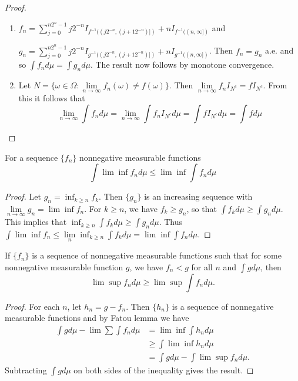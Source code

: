 \begin{proof}
\begin{enumerate}
\item $f_n=\sum_{j=0}^{n2^n-1}j2^{-n}I_{f^{-1}((j2^{-n},(j+12^{-n})])}+nI_{f^{-1}((n,\infty])}$ and 

$g_n=\sum_{j=0}^{n2^n-1}j2^{-n}I_{g^{-1}((j2^{-n},(j+12^{-n})])}+nI_{g^{-1}((n,\infty])}$. Then $f_n=g_n$ a.e. and so $\int f_nd\mu=\int g_nd\mu$. The result now follows by monotone convergence.

\item Let $N=\{\omega\in\Omega: \lim\limits_{n\to\infty}f_n(\omega)\neq f(\omega) \}$. Then $\lim\limits_{n\to\infty}f_nI_{N^c}=fI_{N^c}$. From this it follows that 
\begin{equation*}
\lim\limits_{n\to\infty}\int f_nd\mu = \lim\limits_{n\to\infty}\int f_nI_{N^c}d\mu = \int fI_{N^c}d\mu = \int f d\mu
\end{equation*}
\end{enumerate}
\end{proof}


\begin{lemma}
For a sequence $\{f_n\}$ nonnegative measurable functions
\begin{equation*}
\int \lim \inf f_n d\mu \leq \lim \inf \int f_n d\mu 
\end{equation*}
\end{lemma}



\begin{proof}
Let $g_n = \inf_{k\geq n}f_k$. Then $\{g_n\}$ is an increasing sequence with $\lim\limits_{n\to\infty}g_n=\lim \inf f_n$. For $k\geq n$, we have $f_k\geq g_n$, so that $\int f_kd\mu\geq \int g_nd\mu$. This implies that $\inf_{k\geq n}\int f_k d\mu\geq \int g_n d\mu$. Thus $\int \lim \inf f_n \leq \lim\limits_{n}\inf_{k\geq n}\int f_k d\mu=\lim \inf \int f_nd\mu$.
\end{proof}




\begin{lemma}
If $\{f_n \}$ is a sequence of nonnegative measurable functions such that for some nonnegative measurable function $g$, we have $f_n<g$ for all $n$ and $\int gd\mu$, then
\begin{equation*}
\lim \sup f_n d\mu \geq \lim \sup \int f_n d\mu.
\end{equation*}
\end{lemma}


\begin{proof}
For each $n$, let $h_n=g-f_n$. Then $\{h_n\}$ is a sequence of nonnegative measurable functions and by Fatou lemma we have
\begin{align*}
\int gd\mu - \lim \sum \int f_nd\mu &=\lim \inf \int h_n d\mu \\
	&\geq \int\lim \inf h_nd\mu \\
	&=\int gd\mu - \int \lim\sup f_nd\mu.
\end{align*}
Subtracting $\int gd\mu$ on both sides of the inequality gives the result.
\end{proof}



